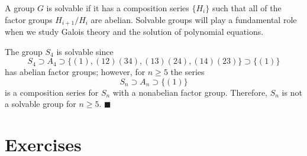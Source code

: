  
\vspace{2ex}
 
 
A group $G$ is {\bfi solvable\/} if it has 
a composition series $\{ H_i \}$ such that all of the factor groups 
$H_{i+1} / H_i$ are abelian. Solvable groups will play a fundamental 
role when we study Galois theory and the solution of polynomial 
equations. 
 
 
\vspace{2ex}
 
 
The group $S_4$ is solvable since
\[
S_4 \supset A_4 \supset \{ (1), (12)(34), (13)(24), (14)(23) \} 
\supset \{ (1) \}
\]
has abelian factor groups; however, for $n \geq 5$ the series
\[
S_n \supset A_n \supset \{ (1) \}
\]
is a composition series for $S_n$ with a nonabelian factor group.
Therefore, $S_n$ is not a solvable group for $n \geq 5$. 
\hspace{\fill} $\blacksquare$
 
 
 
 
\section*{Exercises}
\exrule
 
 
 
